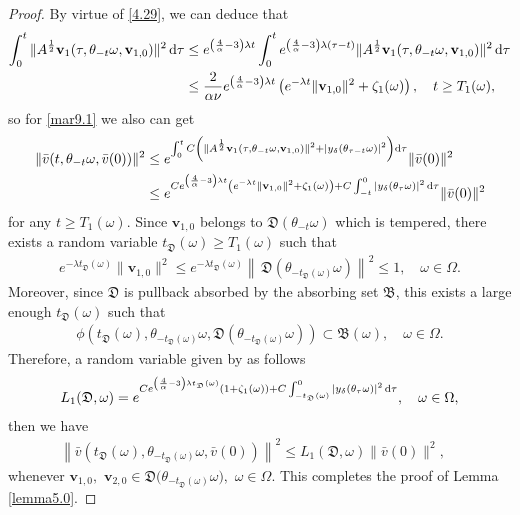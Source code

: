 \documentclass{elsarticle}
\theoremstyle{definition}
\numberwithin{equation}{section}
\newcommand{\be}{\begin{equation}\begin{aligned}}
\newcommand{\ee}{\end{aligned}\end{equation}}
\renewcommand{\d}{{\rm{d}}}
\begin{document}
\begin{proof}
By virtue of \eqref{4.29}, we   can deduce that
\begin{align*}
   \int_0^t \|A^\frac12\textbf{v}_1(\tau,\theta_{-t}\omega, \textbf{v}_{1,0})\|^2 \, \d \tau &\leq e^{ \left(\frac 4 \alpha -3  \right)\lambda t}  \int_0^t e^{ \left( \frac 4 \alpha -3  \right) \lambda (\tau-t)} \|A^\frac12\textbf{v}_1 (\tau,\theta_{-t}\omega, \textbf{v}_{1,0})\|^2  \,  \d \tau  \\
 &   \leq \frac {2}{\alpha\nu} e^{ \left(\frac 4 \alpha -3  \right)\lambda t}  \left( e^{-\lambda t} \|\textbf{v}_{1,0}\|^2 +\zeta_1(\omega) \right) ,\quad t\geq T_1(\omega),
 \end{align*}
so for \eqref{mar9.1} we also can  get
\begin{align*}
 \|\bar v(t,\theta_{-t}\omega, \bar v(0))\|^2
 & \leq  e^{\int_0^tC \left (\|A^\frac12\textbf{v}_1(\tau,\theta_{-t}\omega, \textbf{v}_{1,0})\|^2+|y_\delta(\theta_{\tau-t} \omega)|^2 \right)   \d \tau }
 \|\bar{v}(0)\|^2 \\
 &\leq e^{C  e^{ \left(\frac 4 \alpha -3  \right)\lambda t}  \left( e^{-\lambda t} \|\textbf{v}_{1,0}\|^2 +\zeta_1(\omega) \right) +C\int_{-t}^0|y_\delta(\theta_{\tau} \omega)|^2 \, \d \tau } \|\bar{v}(0)\|^2
\end{align*}
for any $t\geq T_1 (\omega)$.
Since $\textbf{v}_{1,0} $ belongs to $\mathfrak D(\theta_{-t}\omega) $ which is tempered, there exists a random variable $ t_{\mathfrak D} (\omega)  \geq T_1(\omega)$  such that
\begin{align*}
 e^{-\lambda t_{\mathfrak D}(\omega) } \|\textbf{v}_{1,0}\|^2 \leq  e^{-\lambda t_{\mathfrak D}(\omega) } \left \|  \, \mathfrak D \!  \left (\theta_{-t_{\mathfrak D}(\omega)} \omega \right ) \right\|^2 \leq 1,\quad \omega\in \Omega.
\end{align*}
Moreover, since $\mathfrak D$ is pullback absorbed by the absorbing set $\mathfrak B$,  this exists a large enough $t_{\mathfrak D}(\omega)$  such that
\begin{align}\label{mar19.2}
 \phi \left ( t_{\mathfrak D}(\omega) , \theta_{-t_{\mathfrak D}(\omega)}\omega, \mathfrak D(\theta_{- t_{\mathfrak D}(\omega) }\omega) \right ) \subset \mathfrak B(\omega), \quad \omega\in \Omega .
\end{align}
Therefore,  a random variable given by as follows
\begin{align*}
L_1({\mathfrak D}, \omega)=e^{C  e^{ \left(\frac 4 \alpha -3  \right)\lambda  t_{\mathfrak D}(\omega)}    ( 1+\zeta_1(\omega)  ) + C\int_{-t_{\mathfrak D}(\omega)}^0|y_\delta(\theta_{\tau} \omega)|^2 \, \d \tau } ,\quad \omega\in \Omega,
\end{align*}
then we have
\be \label{mar18.8}
\left \|\bar v  \! \left ( t_{\mathfrak D} (\omega) ,\theta_{-t_{\mathfrak D}(\omega)}\omega, \bar v(0) \right) \right \|^2
 \leq L_1({\mathfrak D}, \omega) \|\bar{v}(0)\|^2  ,\quad
\ee
whenever $\textbf{v}_{1,0},$ $\textbf{v}_{2,0}\in \mathfrak D \big ( \theta_{-t_{\mathfrak D}( \omega)}\omega \big),$  $\omega\in \Omega$. This completes the proof of Lemma \ref{lemma5.0}.
\end{proof}
\end{document}
